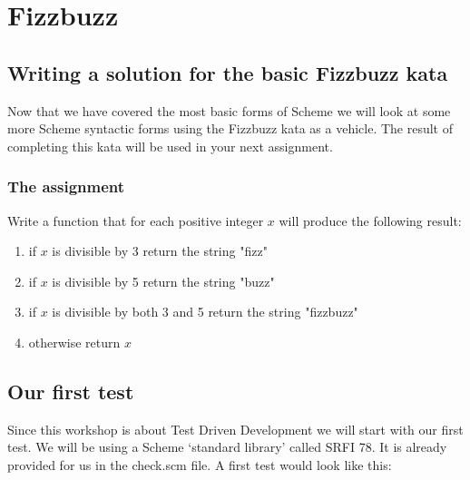 \documentclass[12pt,a4paper,english,twoside]{article}
\begin{document}
\section{Fizzbuzz}
\subsection{Writing a solution for the basic Fizzbuzz kata}
Now that we have covered the most basic forms of Scheme we will look at some 
more Scheme syntactic forms using the Fizzbuzz kata as a vehicle. The result 
of completing this kata will be used in your next assignment.
\subsubsection{The assignment}
Write a function that for each positive integer $x$ will produce the following 
result:
\begin{enumerate}
  \item if $x$ is divisible by 3 return the string "fizz"
  \item if $x$ is divisible by 5 return the string "buzz"
  \item if $x$ is divisible by both 3 and 5 return the string "fizzbuzz"
  \item otherwise return $x$
\end{enumerate}
\subsection{Our first test}
Since this workshop is about Test Driven Development we will start with our 
first test. We will be using a Scheme `standard library' called SRFI 78. It is 
already provided for us in the check.scm file. A first test would look like 
this:
\end{document}
